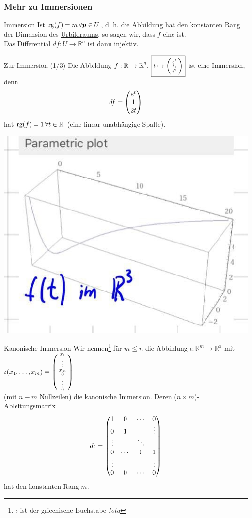 \subsubsection{Mehr zu Immersionen}
\begin{Wiederholung}
{Immersion}
Ist $\text{rg}(f)=m\,\forall {{\text{\boldmath${p}$}}}\in U$, d. h. die Abbildung hat den konstanten Rang der Dimension des \underline{Urbildraums}, so sagen wir, dass $f$ eine  ist.\\
Das Differential $df:U\to\mathbb{R}^n$ ist dann injektiv. 
\end{Wiederholung}
\begin{Beispiel}
{Zur Immersion (1/3)}
Die Abbildung $f:\mathbb{R}\to\mathbb{R}^3,\,\boxed{t\mapsto\left(\begin{smallmatrix}e^t\\t,\\t^2\end{smallmatrix}\right)}$ ist eine Immersion, denn
\begin{equation*}
    df=\begin{pmatrix}e^t\\1\\2t\end{pmatrix}
\end{equation*}
hat $\text{rg}(f)=1\,\forall t\in\mathbb{R}$ (eine linear unabhängige Spalte).
\begin{center}
    \includegraphics[width=.25\textwidth]{Dateien/10/10Immersion1.jpg}
\end{center}
\end{Beispiel}
\begin{Def}
{Kanonische Immersion}
Wir nennen\footnote{$\iota$ ist der griechische Buchstabe \textit{Iota}} für $m\leq n$ die Abbildung $\iota:\mathbb{R}^m\to\mathbb{R}^n$ mit $\iota(x_1,\ldots,x_m)=\left(\begin{smallmatrix}x_1\\\vdots\\x_m\\0\\\vdots\\0\end{smallmatrix}\right)$\\ (mit $n-m$ Nullzeilen) die kanonische Immersion. Deren ($n\times m$)-Ableitungsmatrix
\begin{equation*}
    d\iota=\begin{pmatrix}1&0&\cdots&0\\0&1&&\vdots\\\vdots&&\ddots&\\0&\cdots&0&1\\\vdots&&&\vdots\\0&0&\cdots&0\end{pmatrix}
\end{equation*}
hat den konstanten Rang $m$.
\end{Def}
